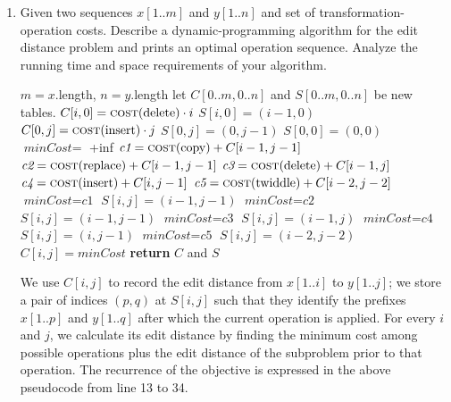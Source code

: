 \documentclass[11pt]{article}
\theoremstyle{definition}
\theoremstyle{theorem}
\newcommand{\solution}{\medskip\noindent{\color{DarkBlue}\textbf{Solution:}}}
\begin{document}
\begin{enumerate}[label=\alph*.]
\item Given two sequences $x[1..m]$ and $y[1..n]$ and set of transformation-operation costs. Describe a dynamic-programming algorithm for the edit distance problem and prints an optimal operation sequence. Analyze the running time and space requirements of your algorithm.

\solution

\begin{algorithmic}[1]
	\State $m = x$.length, $n = y$.length
	\State let $C[0..m, 0..n]$ and $S[0..m, 0..n]$ be new tables. 
		\State $C[i, 0] = \textproc{\textsc{cost}}(\text{delete}) \cdot i$
		\State $S[i, 0] = (i-1, 0)$
	\EndFor
		\State $C[0, j] = \textproc{\textsc{cost}}(\text{insert}) \cdot j$
		\State $S[0, j] = (0, j-1)$
	\EndFor
	\State $S[0, 0] = (0, 0)$
			\State $\textit{minCost} =$ +inf
			\State $\textit{c1} = \textproc{\textsc{cost}}(\text{copy}) + C[i-1, j-1]$ 
			\State $\textit{c2} = \textproc{\textsc{cost}}(\text{replace}) + C[i-1, j-1]$ 
			\State $\textit{c3} = \textproc{\textsc{cost}}(\text{delete}) + C[i-1, j]$ 
			\State $\textit{c4} = \textproc{\textsc{cost}}(\text{insert}) + C[i, j-1]$
			\State $\textit{c5} = \textproc{\textsc{cost}}(\text{twiddle}) + C[i-2, j-2]$
			 
				\State $\textit{minCost} = \textit{c1}$
				\State $S[i, j] = (i - 1, j - 1)$
			\EndIf
				\State $\textit{minCost} = \textit{c2}$
				\State $S[i, j] = (i - 1, j - 1)$
			\EndIf
				\State $\textit{minCost} = \textit{c3}$
				\State $S[i, j] = (i - 1, j)$
			\EndIf
				\State $\textit{minCost} = \textit{c4}$
				\State $S[i, j] = (i, j-1)$
			\EndIf
				\State $\textit{minCost} = \textit{c5}$
				\State $S[i, j] = (i-2, j-2)$
			\EndIf
			\State $C[i, j] = \textit{minCost}$
		\EndFor
	\EndFor
	\State \textbf{return} $C$ and $S$
\EndFunction
\end{algorithmic}

We use $C[i, j]$ to record the edit distance from $x[1..i]$ to $y[1..j]$; we store a pair of indices $(p, q)$ at $S[i, j]$ such that they identify the prefixes $x[1..p]$ and $y[1..q]$ after which the current operation is applied. For every $i$ and $j$, we calculate its edit distance by finding the minimum cost among possible operations plus the edit distance of the subproblem prior to that operation. The recurrence of the objective is expressed in the above pseudocode from line 13 to 34.


\end{enumerate}
\end{document}
